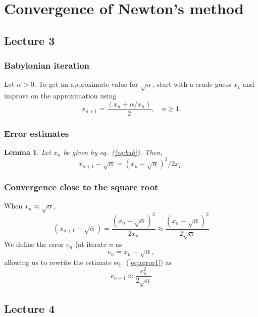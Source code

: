 \documentclass{article}
\newtheorem{lemma}{Lemma}
\begin{document}
\section{Convergence of Newton's method}
\subsection{Lecture 3}
\subsubsection{Babylonian iteration}
Let $\alpha>0$. To get an approximate value for $\sqrt{\alpha}$, start with a crude guess $x_1$ and improve on the approximation using
\begin{equation}
    x_{n+1} = \frac{(x_n+\alpha/x_n)}{2},\quad n\geq1. \label{eq:bab}
\end{equation}
\subsubsection{Error estimates}
\begin{lemma}
    Let $x_n$ be given by eq.~(\ref{eq:bab}). Then,
    \begin{equation}
        x_{n+1}-\sqrt{\alpha}=(x_n-\sqrt{\alpha})^2/2x_n. \label{eq:error1}
    \end{equation}
\end{lemma}
\subsubsection{Convergence close to the square root}
When $x_n\approx \sqrt{\alpha}$,
\begin{equation}
    (x_{n+1}-\sqrt{\alpha}) = \frac{(x_{n}-\sqrt{\alpha})^2}{2x_n} \approx \frac{(x_{n}-\sqrt{\alpha})^2}{2\sqrt{\alpha}}
\end{equation}
We define the error $e_n$ (at iterate $n$ as
\begin{equation}
    e_n = x_n - \sqrt{\alpha},
\end{equation}
allowing us to rewrite the estimate eq.~(\ref{eq:error1}) as
\begin{equation}
    e_{n+1} \approx \frac{e_n^2}{2\sqrt{\alpha}}
\end{equation}

\subsection{Lecture 4}
\end{document}
